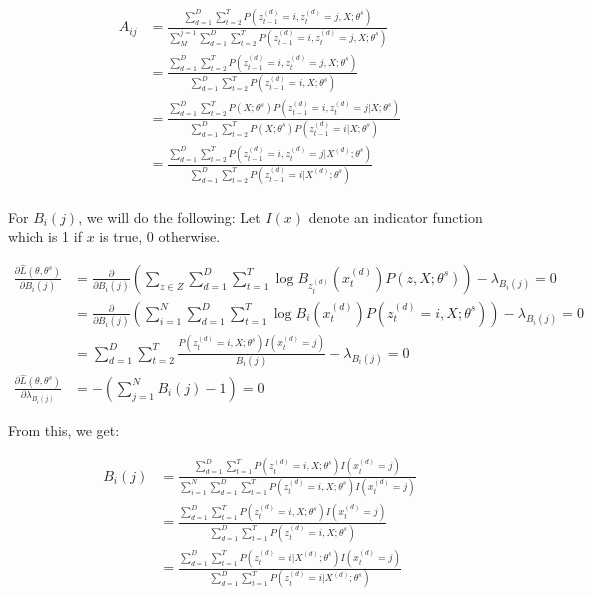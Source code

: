 \documentclass[twoside,11pt]{article}\usepackage{amsmath,amsfonts,amsthm,fullpage}
\begin{document}
\begin{equation} \nonumber
\begin{split}
A_{ij} &= \frac{\sum^D_{d=1} \sum^T_{t=2} P({z_{t-1}^{(d)}} = i,  {z_{t}^{(d)}} = j, X ; \theta^s)}{ \sum_M^{j=1} \sum^D_{d=1} \sum^T_{t=2} P({z_{t-1}^{(d)}} = i,  {z_{t}^{(d)}} = j, X ; \theta^s)} \\
&= \frac{\sum^D_{d=1} \sum^T_{t=2} P({z_{t-1}^{(d)}} = i,  {z_{t}^{(d)}} = j, X ; \theta^s)}{ \sum^D_{d=1} \sum^T_{t=2} P({z_{t-1}^{(d)}} = i, X ; \theta^s)} \\
&= \frac{\sum^D_{d=1} \sum^T_{t=2} P(X ; \theta^s) P({z_{t-1}^{(d)}} = i,  {z_{t}^{(d)}} = j | X ; \theta^s)}{ \sum^D_{d=1} \sum^T_{t=2} P(X ; \theta^s) P({z_{t-1}^{(d)}} = i | X ; \theta^s)} \\
&= \frac{\sum^D_{d=1} \sum^T_{t=2} P({z_{t-1}^{(d)}} = i,  {z_{t}^{(d)}} = j | X^{(d)} ; \theta^s)}{ \sum^D_{d=1} \sum^T_{t=2} P({z_{t-1}^{(d)}} = i | X^{(d)} ; \theta^s)} \\
\end{split}
\end{equation}

For $B_{i}(j)$, we will do the following:
Let $I(x)$ denote an indicator function which is 1 if $x$ is true, 0 otherwise.

\begin{equation} \nonumber
\begin{split}
\frac{\partial \hat{L}(\theta, \theta^s)}{ \partial B_{i}(j)} &= \frac{\partial}{ \partial B_{i}(j)} \left(  \sum_{z \in Z} \sum^D_{d=1} \sum^T_{t=1} \log B_{z_t^{(d)}} (x_t^{(d)})  P(z, X ; \theta^s)  \right) - \lambda_{B_{i}(j)} = 0 \\
&= \frac{\partial}{ \partial B_{i}(j)} \left(  \sum_{i=1}^N \sum^D_{d=1} \sum^T_{t=1} \log B_{i} (x_t^{(d)})  P(z_t^{(d)} = i, X ; \theta^s)  \right) - \lambda_{B_{i}(j)} = 0 \\
&= \sum^D_{d=1} \sum^T_{t=2} \frac{P({z_{t}^{(d)}} = i, X ; \theta^s) I(x_t^{(d)} = j)}{B_{i}(j)} - \lambda_{B_{i}(j)} = 0 \\
\frac{\partial \hat{L}(\theta, \theta^s)}{ \partial \lambda_{B_{i}(j)}} &= - \left( \sum^N_{j=1} B_{i}(j) - 1 \right) = 0
\end{split}
\end{equation}

From this, we get:

\begin{equation} \nonumber
\begin{split}
B_{i}(j) &= \frac{\sum^D_{d=1} \sum^T_{t=1} P({z_{t}^{(d)}} = i, X ; \theta^s) I(x_t^{(d)} = j)}{ \sum_{i=1}^N \sum^D_{d=1} \sum^T_{t=1} P({z_{t}^{(d)}} = i, X ; \theta^s) I(x_t^{(d)} = j)} \\
&= \frac{\sum^D_{d=1} \sum^T_{t=1} P({z_{t}^{(d)}} = i, X ; \theta^s) I(x_t^{(d)} = j)}{ \sum^D_{d=1} \sum^T_{t=1} P({z_{t}^{(d)}} = i, X ; \theta^s)} \\
&= \frac{\sum^D_{d=1} \sum^T_{t=1} P({z_{t}^{(d)}} = i | X^{(d)} ; \theta^s) I(x_t^{(d)} = j)}{ \sum^D_{d=1} \sum^T_{t=1} P({z_{t}^{(d)}} = i | X^{(d)} ; \theta^s)}
\end{split}
\end{equation}
\end{document}
